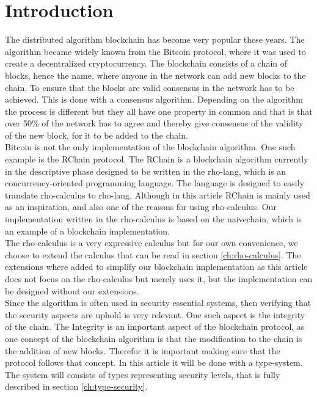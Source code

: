 \section{Introduction}
The distributed algorithm blockchain has become very popular these years. The algorithm became widely known from the Bitcoin protocol, where it was used to create a decentralized cryptocurrency\citep{website:blockchain}. The blockchain consists of a chain of blocks, hence the name, where anyone in the network can add new blocks to the chain. To ensure that the blocks are valid consensus in the network has to be achieved. This is done with a consensus algorithm. Depending on the algorithm the process is different but they all have one property in common and that is that over 50\% of the network has to agree and thereby give consensus of the validity of the new block, for it to be added to the chain.\\
Bitcoin is not the only implementation of the blockchain algorithm. One such example is the RChain protocol. The RChain is a blockchain algorithm currently in the descriptive phase designed to be written in the rho-lang, which is an concurrency-oriented programming language. The language is designed to easily translate rho-calculus to rho-lang\citep{website:rho-lang}. Although in this article RChain is mainly used as an inspiration, and also one of the reasons for using rho-calculus. Our implementation written in the rho-calculus is based on the naivechain, which is an example of a blockchain implementation\citep{naivechain}.\\

The rho-calculus is a very expressive calculus but for our own convenience, we choose to extend the calculus that can be read in section \ref{ch:rho-calculus}. The extensions where added to simplify our blockchain implementation as this article does not focus on the rho-calculus but merely uses it, but the implementation can be designed without our extensions.\\

Since the algorithm is often used in security essential systems, then verifying that the security aspects are uphold is very relevant. One such aspect is the integrity of the chain.
The Integrity is an important aspect of the blockchain protocol, as one concept of the blockchain algorithm is that the modification to the chain is the addition of new blocks. Therefor it is important making sure that the protocol follows that concept. In this article it will be done with a type-system. The system will consists of types representing security levels, that is fully described in section \ref{ch:type-security}.

